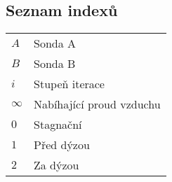 \thispagestyle{empty}
\subsection*{Seznam indexů}
\begin{table}[ht!]
    \begin{tabular}{P{.15\textwidth}|p{.75\textwidth}}
    $A$ & Sonda A \\
    $B$ & Sonda B \\
    $i$ & Stupeň iterace \\
    $\infty$ & Nabíhající proud vzduchu \\
    $0$ & Stagnační \\
    $1$ & Před dýzou \\
    $2$ & Za dýzou
    \end{tabular}
\end{table}


\listoffigures
{}